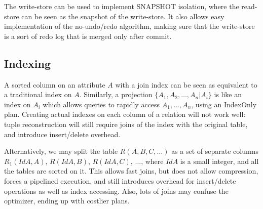 The write-store can be used to implement SNAPSHOT isolation, where the read-store can be seen as the snapshot of the write-store. It also allows easy implementation of the no-undo/redo algorithm, making sure that the write-store is a sort of redo log that is merged only after commit.

\subsection{Indexing}

A sorted column on an attribute $A$ with a join index can be seen as equivalent to a traditional index on $A$. Similarly, a projection $\{A_1, A_2, \dots, A_n | A_i\}$ is like an index on $A_i$ which allows queries to rapidly access $A_1, \dots, A_n$, using an IndexOnly plan. Creating actual indexes on each column of a relation will not work well: tuple reconstruction will still require joins of the index with the original table, and introduce insert/delete overhead.

Alternatively, we may split the table $R(A,B,C,\dots)$ as a set of separate columns $R_1(IdA, A)$, $R(IdA, B)$, $R(IdA, C)$, $\dots$, where $IdA$ is a small integer, and all the tables are sorted on it. This allows fast joins, but does not allow compression, forces a pipelined execution, and still introduces overhead for insert/delete operations as well as index accessing. Also, lots of joins may confuse the optimizer, ending up with costlier plans.